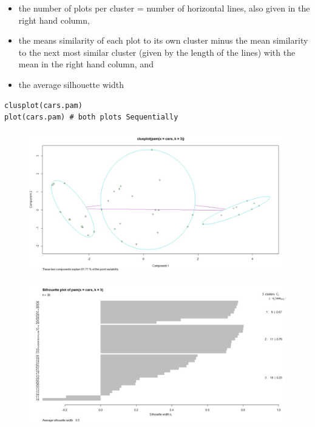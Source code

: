 \documentclass[12pt]{article}
\begin{document}
\begin{itemize}
\item the number of plots per cluster = number of horizontal lines, also given in the right hand column,
\item the means similarity of each plot to its own cluster minus the mean similarity to the next most similar cluster (given by the length of the lines) with the mean in the right hand column, and
\item the average silhouette width
\end{itemize}

\newpage
\begin{framed}
\begin{verbatim}
clusplot(cars.pam)
plot(cars.pam) # both plots Sequentially
\end{verbatim}
\end{framed}
\begin{figure}[h!]
\centering
\includegraphics[width=0.8\linewidth]{./ClusPlot}

\label{fig:ClusPlot}
\end{figure}

\begin{figure}[h!]
\centering
\includegraphics[width=0.9\linewidth]{./SiloPlot}

\label{fig:SiloPlot}
\end{figure}
\end{document}
